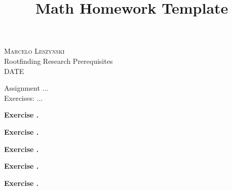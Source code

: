 \documentclass[12pt,oneside]{article}
\newenvironment{exercise}[1]{\vspace{.1in}\noindent\textbf{Exercise #1 \hspace{.05em}}}{}
\begin{document}
\title{Math Homework Template}

\begin{flushright}
\textsc{Marcelo Leszynski}  \\
Rootfinding Research Prerequisites \\
DATE
\end{flushright}

\begin{center}
\textsf{Assignment ... } \\
\textsf{Exercises: ... }
\end{center}


\begin{exercise}{.}

\end{exercise}


\begin{exercise}{.}

\end{exercise}


\begin{exercise}{.}

\end{exercise}


\begin{exercise}{.}

\end{exercise}


\begin{exercise}{.}

\end{exercise}


\end{document}

